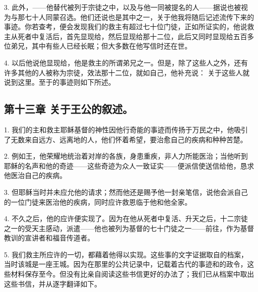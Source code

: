 3. 此外，——他替代被列于宗徒之中，以及与他一同被提名的人——据说也被视为与那七十人同蒙召选。他们还说也是其中之一，关于他我将随后记述流传下来的事迹。你若查考，便会发现我们的救主有超过七十位门徒，正如所证实的，他说救主从死者中复活后，首先显现给，然后显现给那十二位，此后又同时显现给五百多位弟兄，其中有些人已经长眠；但大多数在他写信时还在世。\par

4. 以后他说他显现给，他是救主的所谓弟兄之一。但是，除了这些人之外，还有许多其他的人被称为宗徒，效法那十二位，就如自己，他补充说：  关于这些人就说到这里。至于的事迹则如下所述。\par


\subsection{第十三章  关于王公的叙述。}

1. 我们的主和救主耶稣基督的神性因他行奇能的事迹而传扬于万民之中，他吸引了无数来自远方、远离地的人，他们怀着希望，要治愈自己的疾病和种种苦楚。\par

2. 例如王，他荣耀地统治着对岸的各族，身患重疾，非人力所能医治；当他听到耶稣的名声和他的奇迹——这些奇迹为众人一致证实——便派信使送信给他，恳求他医治自己的疾病。\par

3. 但耶稣当时并未应允他的请求；然而他还是赐予他一封亲笔信，说他会派自己的一位门徒来医治他的疾病，同时应许救恩临于他和他全家。\par

4. 不久之后，他的应许便实现了。因为在他从死者中复活、升天之后，十二宗徒之一的受天主感动，派遣——他也被列为基督的七十门徒之一——前往，作为基督教训的宣讲者和福音传道者。\par

5. 我们救主所应许的一切，都藉着他得以实现。这些事的文字证据取自的档案，当时该城是一座王城。因为在那里的公共记录中，记载着古代的事迹和的政令，这些材料保存至今。但没有比亲自阅读这些书信更好的办法了；我们已从档案中取出这些书信，并从逐字翻译如下。\par

